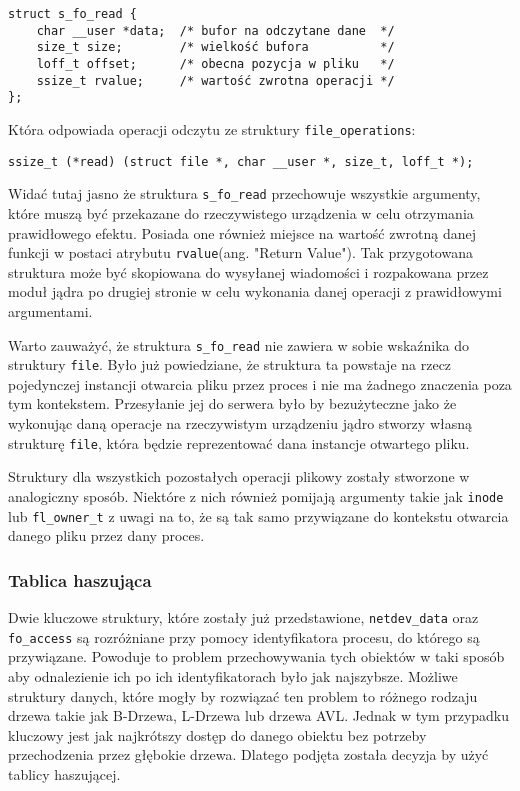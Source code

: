 \documentclass[10pt]{scrartcl}
\begin{document}
\begin{verbatim}
struct s_fo_read {
    char __user *data;  /* bufor na odczytane dane  */
    size_t size;        /* wielkość bufora          */
    loff_t offset;      /* obecna pozycja w pliku   */
    ssize_t rvalue;     /* wartość zwrotna operacji */
};
\end{verbatim}

Która odpowiada operacji odczytu ze struktury \texttt{file\_operations}:

\begin{verbatim}
ssize_t (*read) (struct file *, char __user *, size_t, loff_t *);
\end{verbatim}

Widać tutaj jasno że struktura \texttt{s\_fo\_read} przechowuje wszystkie argumenty, które muszą być przekazane do rzeczywistego urządzenia w celu otrzymania prawidłowego efektu. Posiada one również miejsce na wartość zwrotną danej funkcji w postaci atrybutu \texttt{rvalue}(ang. "Return Value"). Tak przygotowana struktura może być skopiowana do wysyłanej wiadomości i rozpakowana przez moduł jądra po drugiej stronie w celu wykonania danej operacji z prawidłowymi argumentami.

Warto zauważyć, że struktura \texttt{s\_fo\_read} nie zawiera w sobie wskaźnika do struktury \texttt{file}. Było już powiedziane, że struktura ta powstaje na rzecz pojedynczej instancji otwarcia pliku przez proces i nie ma żadnego znaczenia poza tym kontekstem. Przesyłanie jej do serwera było by bezużyteczne jako że wykonując daną operacje na rzeczywistym urządzeniu jądro stworzy własną strukturę \texttt{file}, która będzie reprezentować dana instancje otwartego pliku.

Struktury dla wszystkich pozostałych operacji plikowy zostały stworzone w analogiczny sposób. Niektóre z nich również pomijają argumenty takie jak \texttt{inode} lub \texttt{fl\_owner\_t} z uwagi na to, że są tak samo przywiązane do kontekstu otwarcia danego pliku przez dany proces.

\subsubsection{Tablica haszująca}

Dwie kluczowe struktury, które zostały już przedstawione, \texttt{netdev\_data} oraz \texttt{fo\_access} są rozróżniane przy pomocy identyfikatora procesu, do którego są przywiązane. Powoduje to problem przechowywania tych obiektów w taki sposób aby odnalezienie ich po ich identyfikatorach było jak najszybsze. Możliwe struktury danych, które mogły by rozwiązać ten problem to różnego rodzaju drzewa takie jak B-Drzewa, L-Drzewa lub drzewa AVL\@. Jednak w tym przypadku kluczowy jest jak najkrótszy dostęp do danego obiektu bez potrzeby przechodzenia przez głębokie drzewa. Dlatego podjęta została decyzja by użyć tablicy haszującej.
\end{document}
